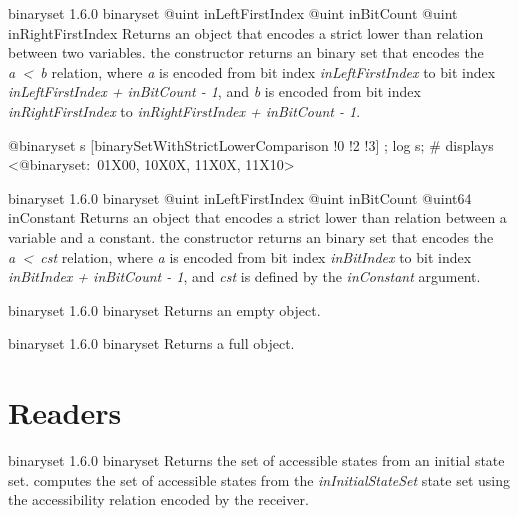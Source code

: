 {binaryset}
{1.6.0}
{binaryset}
{@uint inLeftFirstIndex}
{@uint inBitCount}
{@uint inRightFirstIndex}
{Returns an  object that encodes a strict lower than relation between two variables.}
{the constructor returns an binary set that encodes the \emph{a~<~b} relation, where \emph{a} is encoded from bit index \emph{inLeftFirstIndex} to bit index \emph{inLeftFirstIndex  + inBitCount - 1}, and \emph{b} is encoded from bit index \emph{inRightFirstIndex} to \emph{inRightFirstIndex + inBitCount - 1}.}

\exempleDeuxLignes
{}
{@binaryset s [binarySetWithStrictLowerComparison !0 !2 !3] ;}
{log s; \# displays <@binaryset:~01X00, 10X0X, 11X0X, 11X10>}





{binaryset}
{1.6.0}
{binaryset}
{@uint inLeftFirstIndex}
{@uint inBitCount}
{@uint64 inConstant}
{Returns an  object that encodes a strict lower than relation between a variable and a constant.}
{the constructor returns an binary set that encodes the \emph{a~<~cst} relation, where \emph {a} is encoded from bit index \emph{inBitIndex} to bit index \emph{inBitIndex  + inBitCount - 1}, and \emph{cst} is defined by the \emph{inConstant} argument.}





{binaryset}
{1.6.0}
{binaryset}
{Returns an empty  object.}
{}





{binaryset}
{1.6.0}
{binaryset}
{Returns a full  object.}
{}


\section{Readers}



{binaryset}
{1.6.0}
{binaryset}
{Returns the set of accessible states from an initial state set.}
{computes the set of accessible states from the \emph{inInitialStateSet} state set using the accessibility relation encoded by the receiver.}

